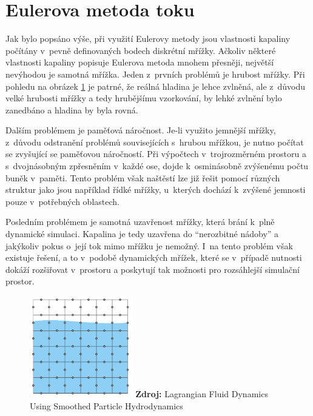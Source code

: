 \section{Eulerova metoda toku}
Jak bylo popsáno výše, při využití Eulerovy metody jsou vlastnosti kapaliny počítány v~pevně definovaných bodech diskrétní mřížky. Ačkoliv některé vlastnosti kapaliny popisuje Eulerova metoda mnohem přesněji, největší nevýhodou je samotná mřížka. Jeden z~prvních problémů je hrubost mřížky. Při pohledu na obrázek \ref{fig:EulerGrid} je patrné, že reálná hladina je lehce zvlněná, ale z~důvodu velké hrubosti mřížky a tedy hrubějšímu vzorkování, by lehké zvlnění bylo zanedbáno a hladina by byla rovná.

Dalším problémem je paměťová náročnost. Je-li využito jemnější mřížky, z~důvodu odstranění problémů souvisejících s~hrubou mřížkou, je nutno počítat se zvyšující se paměťovou náročností. Při výpočtech v~trojrozměrném prostoru a s~dvojnásobným zpřesněním v~každé ose, dojde k~osminásobně zvýšenému počtu buněk v~paměti. Tento problém však naštěstí lze již řešit pomocí různých struktur jako jsou například řídké mřížky, u~kterých dochází k~zvýšené jemnosti pouze v~potřebných oblastech.

Posledním problémem je samotná uzavřenost mřížky, která brání k~plně dynamické simulaci. Kapalina je tedy uzavřena do \enquote{nerozbitné nádoby} a jakýkoliv pokus o~její tok mimo mřížku je nemožný. I~na tento problém však existuje řešení, a to v~podobě dynamických mřížek, které se v~případě nutnosti dokáží rozšiřovat v~prostoru a poskytují tak možnosti pro rozsáhlejší simulační prostor.
\cite{KelagerSPH}

\begin{figure}[hbt]
	\centering
	\captionsetup{justification=centering}
	\includegraphics[width=0.4\textwidth]{obrazky-figures/GridEuler.PNG}
	\textbf{Zdroj: } Lagrangian Fluid Dynamics Using Smoothed Particle Hydrodynamics \cite{KelagerSPH}
	\label{fig:EulerGrid}
\end{figure}

